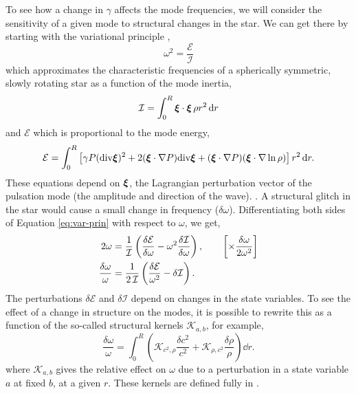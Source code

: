 To see how a change in \(\gamma\) affects the mode frequencies, we will consider the sensitivity of a given mode to structural changes in the star. We can get there by starting with the variational principle \citep{Chandrasekhar1964},
%
\begin{equation}
    \omega^2 = \frac{\mathcal{E}}{\mathcal{I}}\label{eq:var-prin}
\end{equation}
%
which approximates the characteristic frequencies of a spherically symmetric, slowly rotating star as a function of the mode inertia,
%
\begin{equation}
    \mathcal{I} = \int_0^R \bm{\xi} \cdot \bm{\xi} \, \rho r^2 \, \mathrm{d} r
\end{equation}
%
and \(\mathcal{E}\) which is proportional to the mode energy,
%
\begin{equation}
    \mathcal{E} = \int_0^R \left[\gamma P (\mathrm{div} \bm{\xi})^2 + 2(\bm{\xi}\cdot \nabla P) \mathrm{div} \bm{\xi} + (\bm{\xi}\cdot \nabla P) (\bm{\xi}\cdot\nabla\ln\rho)\right] r^2 \, \mathrm{d} r.
\end{equation}
%
These equations depend on \(\bm{\xi}\), the Lagrangian perturbation vector of the pulsation mode (the amplitude and direction of the wave). . A structural glitch in the star would cause a small change in frequency (\(\delta\omega\)). Differentiating both sides of Equation \ref{eq:var-prin} with respect to \(\omega\), we get,
%
\begin{align}
    2\omega &= \frac{1}{\mathcal{I}} \left( \frac{\delta\mathcal{E}}{\delta\omega} - \omega^2 \frac{\delta\mathcal{I}}{\delta\omega}\right), \qquad \left[\times \frac{\delta\omega}{2\omega^2}\right] \notag \\
    \frac{\delta\omega}{\omega} &= \frac{1}{2\,\mathcal{I}} \left(\frac{\delta\mathcal{E}}{\omega^2} - \delta\mathcal{I}\right).
\end{align}
%
The perturbations \(\delta\mathcal{E}\) and \(\delta\mathcal{I}\) depend on changes in the state variables. To see the effect of a change in structure on the modes, it is possible to rewrite this as a function of the so-called structural kernels \(\mathcal{K}_{a,b}\), for example,
%
\begin{equation}
    \frac{\delta\omega}{\omega} = \int_0^R \left(\mathcal{K}_{c^2,\rho} \frac{\delta c^2}{c^2} + \mathcal{K}_{\rho,c^2} \frac{\delta \rho}{\rho} \right) \dd r.\label{eq:kernels}
\end{equation}
%
where \(\mathcal{K}_{a, b}\) gives the relative effect on \(\omega\) due to a perturbation in a state variable \(a\) at fixed \(b\), at a given \(r\). These kernels are defined fully in \citet{Gough.Thompson1991}.

